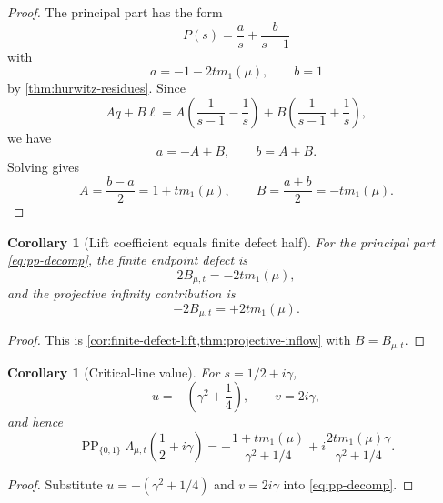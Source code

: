 \documentclass[11pt]{article}
\newcommand{\PP}{\operatorname{PP}}
\newcommand{\ellp}{\ell}
\newcommand{\1}{\mathbf 1}
\newtheorem{corollary}[theorem]{Corollary}
\numberwithin{equation}{section}
\begin{document}
\begin{proof}
The principal part has the form
\begin{equation}
  P(s)=\frac as+\frac b{s-1}
\end{equation}
with
\begin{equation}
  a=-1-2t m_1(\mu),
  \qquad b=1
\end{equation}
by \cref{thm:hurwitz-residues}.  Since
\begin{equation}
  Aq+B\ellp
  =A\left(\frac1{s-1}-\frac1s\right)+B\left(\frac1{s-1}+\frac1s\right),
\end{equation}
we have
\begin{equation}
  a=-A+B,
  \qquad b=A+B.
\end{equation}
Solving gives
\begin{equation}
  A=\frac{b-a}{2}=1+t m_1(\mu),
  \qquad
  B=\frac{a+b}{2}=-t m_1(\mu).
\end{equation}
\end{proof}

\begin{corollary}[Lift coefficient equals finite defect half]\label{cor:lift-defect-half}
For the principal part \eqref{eq:pp-decomp}, the finite endpoint defect is
\begin{equation}
  2B_{\mu,t}=-2t m_1(\mu),
\end{equation}
and the projective infinity contribution is
\begin{equation}
  -2B_{\mu,t}=+2t m_1(\mu).
\end{equation}
\end{corollary}

\begin{proof}
This is \cref{cor:finite-defect-lift,thm:projective-inflow} with $B=B_{\mu,t}$.
\end{proof}

\begin{corollary}[Critical-line value]\label{cor:critical-line-value}
For $s=1/2+i\gamma$,
\begin{equation}
  u=-\left(\gamma^2+\frac14\right),
  \qquad
  v=2i\gamma,
\end{equation}
and hence
\begin{equation}
  \PP_{\{0,1\}}\Lambda_{\mu,t}\left(\frac12+i\gamma\right)
  =-\frac{1+t m_1(\mu)}{\gamma^2+1/4}
  +i\frac{2t m_1(\mu)\gamma}{\gamma^2+1/4}.
\end{equation}
\end{corollary}

\begin{proof}
Substitute $u=-(\gamma^2+1/4)$ and $v=2i\gamma$ into \eqref{eq:pp-decomp}.
\end{proof}
\end{document}
